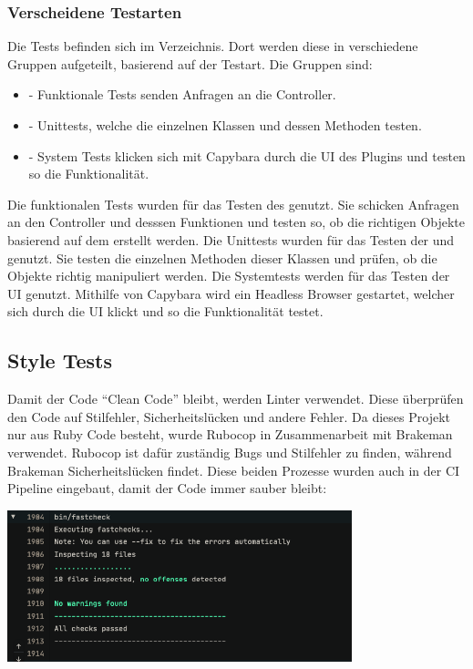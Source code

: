 \subsubsection{Verscheidene Testarten}
Die Tests befinden sich im  Verzeichnis. Dort werden diese in verschiedene
Gruppen aufgeteilt, basierend auf der Testart. Die Gruppen sind:
\begin{itemize}
    \item {} - Funktionale Tests senden Anfragen an die Controller.
    \item {} - Unittests, welche die einzelnen Klassen und dessen Methoden
    testen.
    \item {} - System Tests klicken sich mit Capybara durch die UI des
    Plugins und testen so die Funktionalität.
\end{itemize}
Die funktionalen Tests wurden für das Testen des 
genutzt. Sie schicken Anfragen an den Controller und desssen Funktionen und testen so, ob die richtigen
Objekte basierend auf dem erstellt werden. \newline
Die Unittests wurden für das Testen der  und 
 genutzt. Sie testen die einzelnen Methoden dieser Klassen und
prüfen, ob die Objekte richtig manipuliert werden. \newline
Die Systemtests werden für das Testen der UI genutzt. Mithilfe von Capybara wird ein Headless Browser
gestartet, welcher sich durch die UI klickt und so die Funktionalität testet.
\subsection{Style Tests}
Damit der Code \enquote{Clean Code} bleibt, werden Linter verwendet. Diese überprüfen den Code auf Stilfehler,
Sicherheitslücken und andere Fehler. \newline
Da dieses Projekt nur aus Ruby Code besteht, wurde Rubocop in Zusammenarbeit mit Brakeman verwendet. Rubocop
ist dafür zuständig Bugs und Stilfehler zu finden, während Brakeman Sicherheitslücken findet. Diese beiden
Prozesse wurden auch in der CI Pipeline eingebaut, damit der Code immer sauber bleibt:
\begin{center}
    \includegraphics[width=0.75\textwidth]{images/misc/stylecheck_ci.png}
    \label{fig:ci_pipeline}
\end{center}

